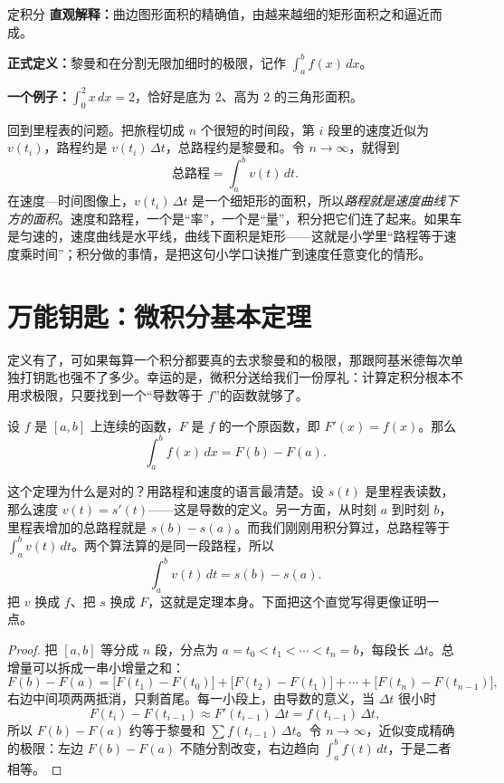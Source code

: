 \begin{shuyu}{定积分}
\textbf{直观解释：}曲边图形面积的精确值，由越来越细的矩形面积之和逼近而成。

\textbf{正式定义：}黎曼和在分割无限加细时的极限，记作 $\int_a^b f(x)\,dx$。

\textbf{一个例子：}$\int_0^2 x\,dx=2$，恰好是底为 $2$、高为 $2$ 的三角形面积。
\end{shuyu}

回到里程表的问题。把旅程切成 $n$ 个很短的时间段，第 $i$ 段里的速度近似为 $v(t_i)$，路程约是 $v(t_i)\,\Delta t$，总路程约是黎曼和。令 $n\to\infty$，就得到
\[
\text{总路程}=\int_a^b v(t)\,dt .
\]
在速度—时间图像上，$v(t_i)\,\Delta t$ 是一个细矩形的面积，所以\emph{路程就是速度曲线下方的面积}。速度和路程，一个是“率”，一个是“量”，积分把它们连了起来。如果车是匀速的，速度曲线是水平线，曲线下面积是矩形——这就是小学里“路程等于速度乘时间”；积分做的事情，是把这句小学口诀推广到速度任意变化的情形。

\section{万能钥匙：微积分基本定理}

定义有了，可如果每算一个积分都要真的去求黎曼和的极限，那跟阿基米德每次单独打钥匙也强不了多少。幸运的是，微积分送给我们一份厚礼：计算定积分根本不用求极限，只要找到一个“导数等于 $f$”的函数就够了。

\begin{dingli}[微积分基本定理]
设 $f$ 是 $[a,b]$ 上连续的函数，$F$ 是 $f$ 的一个原函数，即 $F'(x)=f(x)$。那么
\[
\int_a^b f(x)\,dx=F(b)-F(a).
\]
\end{dingli}

这个定理为什么是对的？用路程和速度的语言最清楚。设 $s(t)$ 是里程表读数，那么速度 $v(t)=s'(t)$——这是导数的定义。另一方面，从时刻 $a$ 到时刻 $b$，里程表增加的总路程就是 $s(b)-s(a)$。而我们刚刚用积分算过，总路程等于 $\int_a^b v(t)\,dt$。两个算法算的是同一段路程，所以
\[
\int_a^b v(t)\,dt=s(b)-s(a).
\]
把 $v$ 换成 $f$、把 $s$ 换成 $F$，这就是定理本身。下面把这个直觉写得更像证明一点。

\begin{proof}
把 $[a,b]$ 等分成 $n$ 段，分点为 $a=t_0<t_1<\cdots<t_n=b$，每段长 $\Delta t$。总增量可以拆成一串小增量之和：
\[
F(b)-F(a)=\bigl[F(t_1)-F(t_0)\bigr]+\bigl[F(t_2)-F(t_1)\bigr]+\cdots+\bigl[F(t_n)-F(t_{n-1})\bigr],
\]
右边中间项两两抵消，只剩首尾。每一小段上，由导数的意义，当 $\Delta t$ 很小时
\[
F(t_i)-F(t_{i-1})\approx F'(t_{i-1})\,\Delta t=f(t_{i-1})\,\Delta t ,
\]
所以 $F(b)-F(a)$ 约等于黎曼和 $\sum f(t_{i-1})\,\Delta t$。令 $n\to\infty$，近似变成精确的极限：左边 $F(b)-F(a)$ 不随分割改变，右边趋向 $\int_a^b f(t)\,dt$，于是二者相等。
\end{proof}

